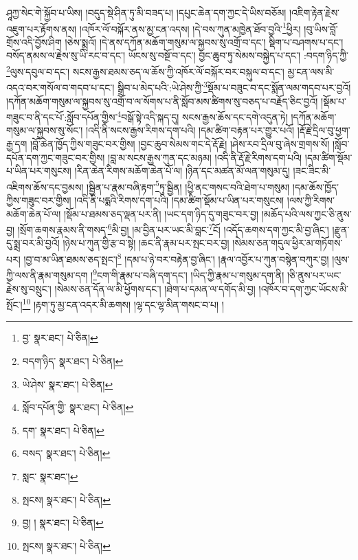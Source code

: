 ཤཱཀྱ་སེང་གེ་སྐྱོབ་པ་ཡིས། །བདུད་སྡེ་ཤིན་ཏུ་མི་བཟད་པ། །དཔུང་ཆེན་དག་ཀྱང་དེ་ཡིས་བཅོམ། །འཇིག་རྟེན་རྗེས་འཇུག་པར་རྟོགས་ནས། །འཁོར་ལོ་བསྐོར་ནས་མྱ་ངན་འདས། །དེ་བས་ཀུན་མཁྱེན་ཐོབ་བྱའི་\footnote{བྱ་  སྣར་ཐང་།  པེ་ཅིན། }ཕྱིར། །བུ་ཡིས་བློ་གྲོས་འདི་བྱོས་ཤིག །ཅེས་སྨྲའོ། །དེ་ནས་དཀོན་མཆོག་གསུམ་ལ་སྐྱབས་སུ་འགྲོ་བ་དང་། སྡིག་པ་བཤགས་པ་དང་། བསོད་ནམས་ལ་རྗེས་སུ་ཡི་རང་བ་དང་། ཡོངས་སུ་བསྔོ་བ་དང་། བྱང་ཆུབ་ཏུ་སེམས་བསྐྱེད་པ་དང་། :བདག་ཉིད་ཀྱི་\footnote{བདག་ཉིད་  སྣར་ཐང་།  པེ་ཅིན། }ལུས་དབུལ་བ་དང་། སངས་རྒྱས་ཐམས་ཅད་ལ་ཆོས་ཀྱི་འཁོར་ལོ་བསྐོར་བར་བསྐུལ་བ་དང་། མྱ་ངན་ལས་མི་འདའ་བར་གསོལ་བ་གདབ་པ་དང་། སྒྲིབ་པ་མེད་པའི་:ཡེ་ཤེས་ཀྱི་\footnote{ཡེ་ཤེས་  སྣར་ཐང་།  པེ་ཅིན། }སྡོམ་པ་བཟུང་བ་དང་སྨོན་ལམ་གདབ་པར་བྱའོ། །དཀོན་མཆོག་གསུམ་ལ་སྐྱབས་སུ་འགྲོ་བ་ལ་སོགས་པ་ནི་སློབ་མས་ཚིགས་སུ་བཅད་པ་བརྗོད་ཅིང་བྱའོ། །སྡོམ་པ་གཟུང་བ་ནི་དང་པོ་:སློབ་དཔོན་གྱིས་\footnote{སློབ་དཔོན་གྱི་  སྣར་ཐང་།  པེ་ཅིན། }བསྒོ་སྟེ་འདི་སྐད་དུ། སངས་རྒྱས་ཆོས་དང་དགེ་འདུན་ཏེ། །དཀོན་མཆོག་གསུམ་ལ་སྐྱབས་སུ་སོང་། །འདི་ནི་སངས་རྒྱས་རིགས་དག་པའི། །དམ་ཚིག་བརྟན་པར་གྱུར་པའོ། །རྡོ་རྗེ་དྲིལ་བུ་ཕྱག་རྒྱ་དག །བློ་ཆེན་ཁྱོད་ཀྱིས་གཟུང་བར་གྱིས། །བྱང་ཆུབ་སེམས་གང་དེ་རྡོ་རྗེ། །ཤེས་རབ་དྲིལ་བུ་ཞེས་གྲགས་སོ། །སློབ་དཔོན་དག་ཀྱང་གཟུང་བར་གྱིས། །བླ་མ་སངས་རྒྱས་ཀུན་དང་མཉམ། །འདི་ནི་རྡོ་རྗེ་རིགས་དག་པའི། །དམ་ཚིག་སྡོམ་པ་ཡིན་པར་གསུངས། །རིན་ཆེན་རིགས་མཆོག་ཆེན་པོ་ལ། །ཉིན་དང་མཚན་མོ་ལན་གསུམ་དུ། །ཟང་ཟིང་མི་འཇིགས་ཆོས་དང་བྱམས། །སྦྱིན་པ་རྣམ་བཞི་རྟག་\footnote{དག་  སྣར་ཐང་།  པེ་ཅིན། }ཏུ་སྦྱིན། །ཕྱི་ནང་གསང་བའི་ཐེག་པ་གསུམ། །དམ་ཆོས་ཁྱོད་ཀྱིས་གཟུང་བར་གྱིས། །འདི་ནི་པདྨའི་རིགས་དག་པའི། །དམ་ཚིག་སྡོམ་པ་ཡིན་པར་གསུངས། །ལས་ཀྱི་རིགས་མཆོག་ཆེན་པོ་ལ། །སྡོམ་པ་ཐམས་ཅད་ལྡན་པར་ནི། །ཡང་དག་ཉིད་དུ་གཟུང་བར་བྱ། །མཆོད་པའི་ལས་ཀྱང་ཅི་ནུས་བྱ། །སྲོག་ཆགས་རྣམས་ནི་གསད་\footnote{བསད་  སྣར་ཐང་།  པེ་ཅིན། }མི་བྱ། །མ་བྱིན་པར་ཡང་མི་བླང་\footnote{སླང་  སྣར་ཐང་། }ངོ། །འདོད་ཆགས་དག་ཀྱང་མི་བྱ་ཞིང་། །རྫུན་དུ་སྨྲ་བར་མི་བྱའོ། །ཉེས་པ་ཀུན་གྱི་རྩ་བ་སྟེ། །ཆང་ནི་རྣམ་པར་སྤང་བར་བྱ། །སེམས་ཅན་གདུལ་ཕྱིར་མ་གཏོགས་པར། །བྱ་བ་མ་ཡིན་ཐམས་ཅད་སྤང་།\footnote{སྤངས།  སྣར་ཐང་།  པེ་ཅིན། } །དམ་པ་ཉེ་བར་བརྟེན་བྱ་ཞིང་། །རྣལ་འབྱོར་པ་ཀུན་བསྙེན་བཀུར་བྱ། །ལུས་ཀྱི་ལས་ནི་རྣམ་གསུམ་དག །\footnote{བྱ། །  སྣར་ཐང་།  པེ་ཅིན། }ངག་གི་རྣམ་པ་བཞི་དག་དང་། །ཡིད་ཀྱི་རྣམ་པ་གསུམ་དག་ནི། །ཅི་ནུས་པར་ཡང་རྗེས་སུ་བསྲུང་། །སེམས་ཅན་དོན་ལ་མི་ཕྱོགས་དང་། །ཐེག་པ་དམན་ལ་དགོད་མི་བྱ། །འཁོར་བ་དག་ཀྱང་ཡོངས་མི་སྤོང་།\footnote{སྤངས།  སྣར་ཐང་།  པེ་ཅིན། } །རྟག་ཏུ་མྱ་ངན་འདར་མི་ཆགས། །ལྷ་དང་ལྷ་མིན་གསང་བ་པ། །
